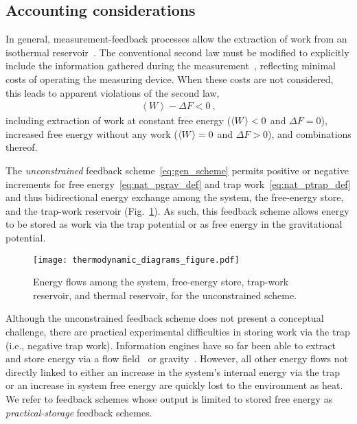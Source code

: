 \documentclass[%
reprint,
bibnotes, amsmath, amssymb, aps, pre,
 showkeys,
floatfix
]{revtex4-2}
\begin{document}
\subsection{Accounting considerations}
\label{subsec:accounting_considerations}

In general, measurement-feedback processes allow the extraction of work from an isothermal reservoir~\cite{Parrondo2015a}. 
The conventional second law must be modified to explicitly include the information gathered during the measurement~\cite{Sagawa2010,Horowitz2010,Sagawa2012}, reflecting minimal costs of operating the measuring device.
When these costs are not considered, this leads to apparent violations of the second law,
\begin{align}
    \left\langle W \right\rangle - \Delta F < 0\ ,
\end{align}
including extraction of work at constant free energy ($\ev{W}<0$ and $\Delta F =0$), increased free energy without any work ($\ev{W}=0$ and $\Delta F>0$), and combinations thereof.

The \emph{unconstrained} feedback scheme~\eqref{eq:gen_scheme} permits positive or negative increments for free energy~\eqref{eq:nat_pgrav_def} and trap work~\eqref{eq:nat_ptrap_def} and thus bidirectional energy exchange among the system, the free-energy store, and the trap-work reservoir (Fig.~\ref{fig:full_extraction_diagram}). 
As such, this feedback scheme allows energy to be stored as work via the trap potential or as free energy in the gravitational potential.

\begin{figure}[htbp]
    \centering
    \texttt{[image: thermodynamic\_diagrams\_figure.pdf]}
    \caption{
        Energy flows among the system, free-energy store, trap-work reservoir, and thermal reservoir, for the unconstrained scheme. 
        }
    \label{fig:full_extraction_diagram}
\end{figure}

Although the unconstrained feedback scheme does not present a conceptual challenge, there are practical experimental difficulties in storing work via the trap (i.e., negative trap work).
Information engines have so far been able to extract and store energy via a flow field~\cite{admon2018} or gravity~\cite{Saha2021}.
However, all other energy flows not directly linked to either an increase in the system's internal energy via the trap or an increase in system free energy are quickly lost to the environment as heat. 
We refer to feedback schemes whose output is limited to stored free energy as \emph{practical-storage} feedback schemes.
\end{document}
